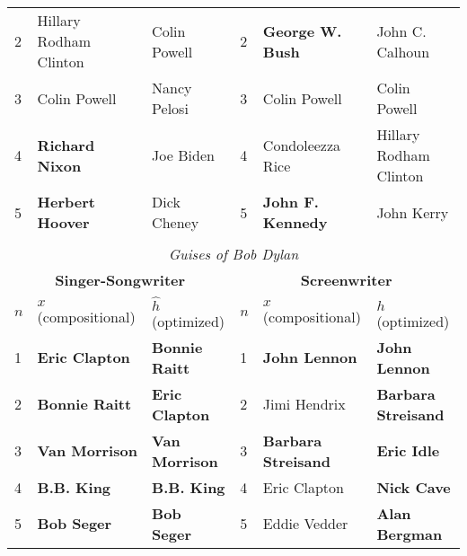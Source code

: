\documentclass[a4paper,10pt]{article}
\begin{document}
\begin{table*}
\begin{tabular}{lll | lll}
 {\scriptsize 2 } & { \scriptsize Hillary Rodham Clinton } & { \scriptsize Colin Powell}&  {\scriptsize 2 } & { \scriptsize \textbf{George W. Bush} } & { \scriptsize John C. Calhoun}\\ 
 {\scriptsize 3 } & { \scriptsize Colin Powell } & { \scriptsize Nancy Pelosi} &  {\scriptsize 3 } & { \scriptsize Colin Powell } & { \scriptsize Colin Powell }\\ 
 {\scriptsize 4 } & { \scriptsize \textbf{Richard Nixon} } & { \scriptsize Joe Biden} &  {\scriptsize 4 } & { \scriptsize Condoleezza Rice } & { \scriptsize Hillary Rodham Clinton}\\ 
 {\scriptsize 5 } & { \scriptsize \textbf{Herbert Hoover} } & { \scriptsize Dick Cheney } &  {\scriptsize 5 } & { \scriptsize \textbf{John F. Kennedy} } & { \scriptsize John Kerry }\\ \hline  
 \\
\multicolumn{6}{c}{ \emph{Guises of Bob Dylan } } \\ \hline \hline
 \multicolumn{3}{c}{\small \textbf{Singer-Songwriter}} & \multicolumn{3}{c}{\small \textbf{Screenwriter}}  \\  \hline
 \multicolumn{1}{l}{\small $n$} & \multicolumn{1}{l}{\small \textbf{$x$} (compositional)} & \multicolumn{1}{l|}{\small \textbf{$\hat{h}$} (optimized)} & \multicolumn{1}{l}{\small $n$} & \multicolumn{1}{l}{\small \textbf{$x$} (compositional)} & \multicolumn{1}{l}{\small \textbf{$\hat{h}$} (optimized)}\\ \hline 
  {\scriptsize 1 } & { \scriptsize \textbf{Eric Clapton} } & { \scriptsize \textbf{Bonnie Raitt}} &  {\scriptsize 1 } & { \scriptsize \textbf{John Lennon} } & { \scriptsize \textbf{John Lennon}} \\ 
 {\scriptsize 2 } & { \scriptsize \textbf{Bonnie Raitt} } & { \scriptsize \textbf{Eric Clapton}} &  {\scriptsize 2 } & { \scriptsize Jimi Hendrix } & { \scriptsize \textbf{Barbara Streisand}}\\ 
 {\scriptsize 3 } & { \scriptsize \textbf{Van Morrison} } & { \scriptsize \textbf{Van Morrison}} &  {\scriptsize 3 } & { \scriptsize \textbf{Barbara Streisand} } & { \scriptsize \textbf{Eric Idle}}\\ 
 {\scriptsize 4 } & { \scriptsize \textbf{B.B. King} } & { \scriptsize \textbf{B.B. King} } &  {\scriptsize 4 } & { \scriptsize Eric Clapton } & { \scriptsize \textbf{Nick Cave}}\\ 
 {\scriptsize 5 } & { \scriptsize \textbf{Bob Seger}  } & { \scriptsize \textbf{Bob Seger}} &  {\scriptsize 5 } & { \scriptsize Eddie Vedder } & { \scriptsize \textbf{Alan Bergman}}\\ \hline

\end{tabular}
\end{table*}
\end{document}
